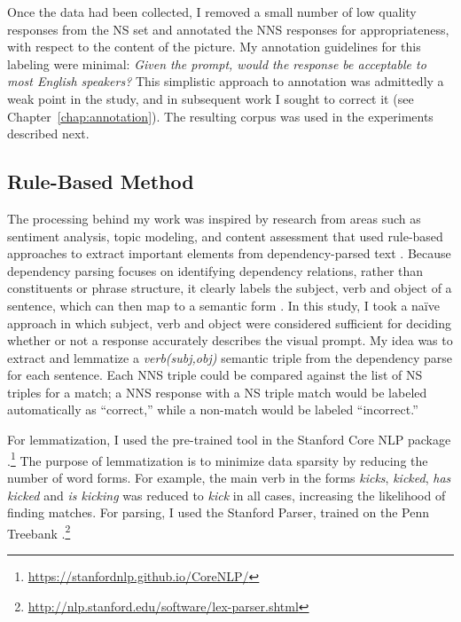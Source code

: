 Once the data had been collected, I removed a small number of low quality responses from the NS set and annotated the NNS responses for appropriateness, with respect to the content of the picture. My annotation guidelines for this labeling were minimal: \textit{Given the prompt, would the response be acceptable to most English speakers?} This simplistic approach to annotation was admittedly a weak point in the study, and in subsequent work I sought to correct it (see Chapter~\ref{chap:annotation}). The resulting corpus was used in the experiments described next.


\subsection{Rule-Based Method}
\label{sec:rule-method}

The processing behind my work was inspired by research from areas such as sentiment analysis, topic modeling, and content assessment that used rule-based approaches to extract important elements from dependency-parsed text \citep{nastase2006,bailey:meurers:08,dicaro2013}. Because dependency parsing focuses on identifying dependency relations, rather than constituents or phrase structure, it clearly labels the subject, verb and object of a sentence, which can then map to a semantic form \citep{Kuebler.McDonald.Nivre-09}. In this study, I took a na\"ive approach in which subject, verb and object were considered sufficient for deciding whether or not a response accurately describes the visual prompt. My idea was to extract and lemmatize a \textit{verb(subj,obj)} semantic triple from the dependency parse for each sentence. Each NNS triple could be compared against the list of NS triples for a match; a NNS response with a NS triple match would be labeled automatically as ``correct,'' while a non-match would be labeled ``incorrect.''

For lemmatization, I used the pre-trained tool in the Stanford Core NLP package \citep{stanford-corenlp-2014}.\footnote{\url{https://stanfordnlp.github.io/CoreNLP/}} The purpose of lemmatization is to minimize data sparsity by reducing the number of word forms. For example, the main verb in the forms \textit{kicks}, \textit{kicked}, \textit{has kicked} and \textit{is kicking} was reduced to \textit{kick} in all cases, increasing the likelihood of finding matches. For parsing, I used the Stanford Parser, trained on the Penn Treebank \citep{demarneffe:ea:06, klein:manning:03}.\footnote{\url{http://nlp.stanford.edu/software/lex-parser.shtml}}


